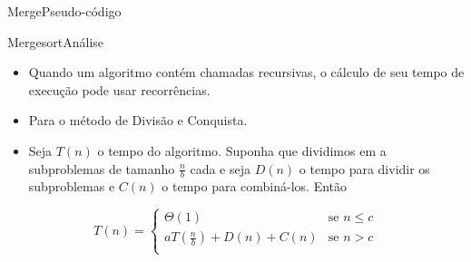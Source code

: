 \documentclass[aspectratio=169]{beamer}
\begin{document}
\begin{frame}{Merge}{Pseudo-código}

\end{frame}


\begin{frame}{Mergesort}{Análise}
\begin{itemize}
\item Quando um algoritmo contém chamadas recursivas, o cálculo de seu tempo de execução pode usar recorrências.
\item Para o método de Divisão e Conquista.
\item Seja $T(n)$ o tempo do algoritmo. Suponha que dividimos em a subproblemas de tamanho $\frac{n}{b}$ cada e seja $D(n)$ o tempo para dividir os subproblemas e $C(n)$ o tempo para combiná-los. Então
\end{itemize}
\begin{equation*}
    T(n) = \begin{cases}
               \Theta(1)                      & \textrm{se } n \leq c\\
               aT(\frac{n}{b}) + D(n) +C(n)  & \textrm{se } n > c \\
           \end{cases}
\end{equation*}
\end{frame}
\end{document}
